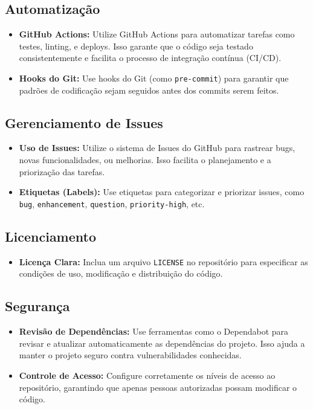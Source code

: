 \documentclass[a4paper,11pt]{article}
\begin{document}
\subsection{Automatização}
\begin{itemize}
	\item \textbf{GitHub Actions:} Utilize GitHub Actions para automatizar tarefas como testes, linting, e deploys. Isso garante que o código seja testado consistentemente e facilita o processo de integração contínua (CI/CD).
	\item \textbf{Hooks do Git:} Use hooks do Git (como \texttt{pre-commit}) para garantir que padrões de codificação sejam seguidos antes dos commits serem feitos.
\end{itemize}

\subsection{Gerenciamento de Issues}
\begin{itemize}
	\item \textbf{Uso de Issues:} Utilize o sistema de Issues do GitHub para rastrear bugs, novas funcionalidades, ou melhorias. Isso facilita o planejamento e a priorização das tarefas.
	\item \textbf{Etiquetas (Labels):} Use etiquetas para categorizar e priorizar issues, como \texttt{bug}, \texttt{enhancement}, \texttt{question}, \texttt{priority-high}, etc.
\end{itemize}

\subsection{Licenciamento}
\begin{itemize}
	\item \textbf{Licença Clara:} Inclua um arquivo \texttt{LICENSE} no repositório para especificar as condições de uso, modificação e distribuição do código.
\end{itemize}

\subsection{Segurança}
\begin{itemize}
	\item \textbf{Revisão de Dependências:} Use ferramentas como o Dependabot para revisar e atualizar automaticamente as dependências do projeto. Isso ajuda a manter o projeto seguro contra vulnerabilidades conhecidas.
	\item \textbf{Controle de Acesso:} Configure corretamente os níveis de acesso ao repositório, garantindo que apenas pessoas autorizadas possam modificar o código.
\end{itemize}
\end{document}
